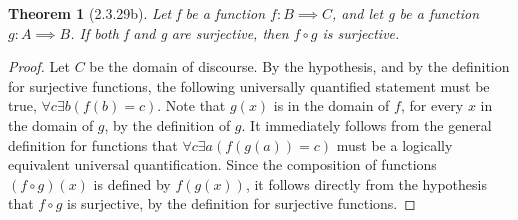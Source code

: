 \documentclass[a4paper, 12pt]{article}
\theoremstyle{plain}
\newtheorem*{theorem*}{Theorem}
\begin{document}
	
	\begin{theorem*}[2.3.29b]
		Let f be a function $f: B \implies C$, and let g be a function $g: A \implies B$. If both f 
		and g are surjective, then $f \circ g$ is surjective.
	\end{theorem*}
	
	\begin{proof}
		Let $C$ be the domain of discourse. By the hypothesis, and by the definition for surjective 
		functions, the following universally quantified \newline statement must be true, 
		$\forall c \exists b (f(b) = c)$. Note that $g(x)$ is in the domain of $f$, for every $x$ 
		in the domain of $g$, by the definition of $g$. It immediately follows from the general 
		definition for functions that $\forall c \exists a (f(g(a)) = c)$ must be a logically 
		equivalent universal quantification. Since the composition of \newline functions 
		$(f \circ g)(x)$ is defined by $f(g(x))$, it follows directly from the \newline hypothesis 
		that $f \circ g$ is surjective, by the definition for surjective functions.  
	\end{proof}
\end{document}
